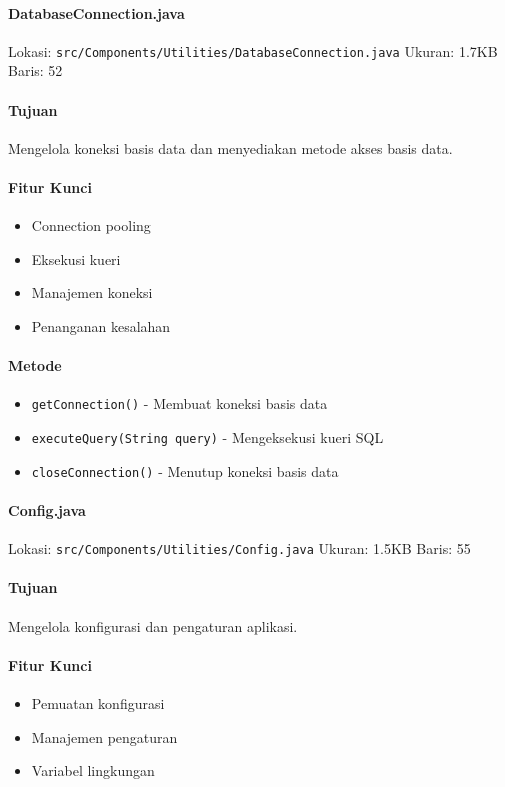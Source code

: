 \documentclass[12pt,a4paper]{article}
\begin{document}
\paragraph{DatabaseConnection.java}
Lokasi: \texttt{src/Components/Utilities/DatabaseConnection.java}
Ukuran: 1.7KB
Baris: 52

\paragraph{Tujuan}
Mengelola koneksi basis data dan menyediakan metode akses basis data.

\paragraph{Fitur Kunci}
\begin{itemize}
    \item Connection pooling
    \item Eksekusi kueri
    \item Manajemen koneksi
    \item Penanganan kesalahan
\end{itemize}

\paragraph{Metode}
\begin{itemize}
    \item \texttt{getConnection()} - Membuat koneksi basis data
    \item \texttt{executeQuery(String query)} - Mengeksekusi kueri SQL
    \item \texttt{closeConnection()} - Menutup koneksi basis data
\end{itemize}

\paragraph{Config.java}
Lokasi: \texttt{src/Components/Utilities/Config.java}
Ukuran: 1.5KB
Baris: 55

\paragraph{Tujuan}
Mengelola konfigurasi dan pengaturan aplikasi.

\paragraph{Fitur Kunci}
\begin{itemize}
    \item Pemuatan konfigurasi
    \item Manajemen pengaturan
    \item Variabel lingkungan
\end{itemize}
\end{document}
